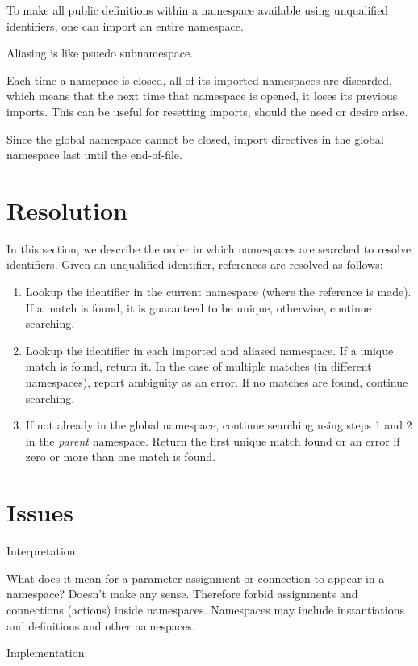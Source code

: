 To make all public definitions within a namespace available
using unqualified identifiers, one can import an entire namespace.  

Aliasing is like psuedo subnamespace.

Each time a namepace is closed, all of its imported namespaces are
discarded, which means that the next time that namespace is opened, 
it loses its previous imports.  
This can be useful for resetting imports, should the need or desire arise.  

Since the global namespace cannot be closed, 
import directives in the global namespace last until the end-of-file.  


\section{Resolution}
\label{sec:namespaces:resolution}

In this section, we describe the order in which namespaces are
searched to resolve identifiers.  
Given an unqualified identifier, references are resolved as follows:

\begin{enumerate}
\item Lookup the identifier in the current namespace 
	(where the reference is made).  
	If a match is found, it is guaranteed to be unique, 
	otherwise, continue searching.  
\item Lookup the identifier in each imported and aliased namespace.  
	If a unique match is found, return it.  
	In the case of multiple matches (in different namespaces), 
	report ambiguity as an error.  
	If no matches are found, continue searching.
\item If not already in the global namespace, 
	continue searching using steps 1 and 2 in the \emph{parent} namespace.  
	Return the first unique match found or an error if zero
	or more than one match is found.  
\end{enumerate}

\section{Issues}
\label{sec:namespaces:issues}

Interpretation:

What does it mean for a parameter assignment or connection to 
appear in a namespace?  
Doesn't make any sense.  
Therefore forbid assignments and connections (actions) inside namespaces.  
Namespaces may include instantiations and definitions and other namespaces.  

Implementation:

